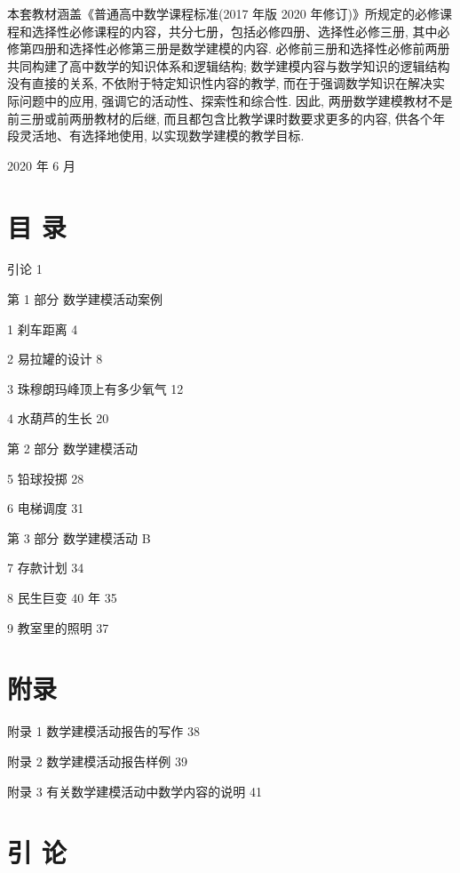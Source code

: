 \documentclass[10pt]{article}
\begin{document}
本套教材涵盖《普通高中数学课程标准(2017 年版 2020 年修订)》所规定的必修课程和选择性必修课程的内容，共分七册，包括必修四册、选择性必修三册, 其中必修第四册和选择性必修第三册是数学建模的内容. 必修前三册和选择性必修前两册共同构建了高中数学的知识体系和逻辑结构; 数学建模内容与数学知识的逻辑结构没有直接的关系, 不依附于特定知识性内容的教学, 而在于强调数学知识在解决实际问题中的应用, 强调它的活动性、探索性和综合性. 因此, 两册数学建模教材不是前三册或前两册教材的后继, 而且都包含比教学课时数要求更多的内容, 供各个年段灵活地、有选择地使用, 以实现数学建模的教学目标.

2020 年 6 月

\section*{}

\section*{目 录}

引论 1

第 1 部分 数学建模活动案例

1 刹车距离 4

2 易拉罐的设计 8

3 珠穆朗玛峰顶上有多少氧气 12

4 水葫芦的生长 20

第 2 部分 数学建模活动

5 铅球投掷 28

6 电梯调度 31

第 3 部分 数学建模活动 B

7 存款计划 34

8 民生巨变 40 年 35

9 教室里的照明 37

\section*{附录}

附录 1 数学建模活动报告的写作 38

附录 2 数学建模活动报告样例 39

附录 3 有关数学建模活动中数学内容的说明 41



\section*{}

\section*{引 论}
\end{document}
